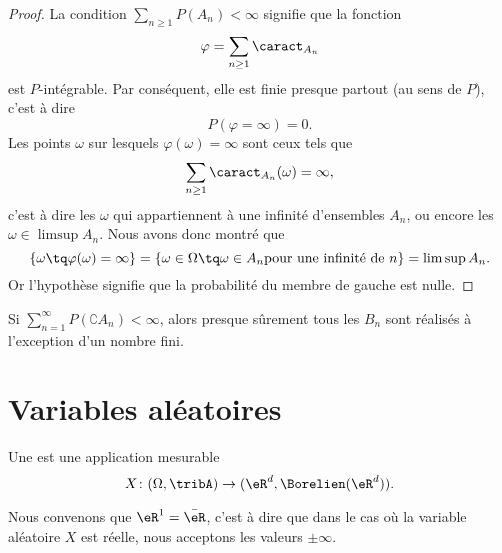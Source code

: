 \begin{proof}
    La condition \( \sum_{n\geq 1}P(A_n)<\infty\) signifie que la fonction
    \begin{equation}
        \varphi=\sum_{n\geq 1}\caract_{A_n}
    \end{equation}
    est \( P\)-intégrable. Par conséquent, elle est finie presque partout (au sens de \( P\)), c'est à dire
    \begin{equation}
        P(\varphi=\infty)=0.
    \end{equation}
    Les points \( \omega\) sur lesquels \( \varphi(\omega)=\infty\) sont ceux tels que
    \begin{equation}
        \sum_{n\geq 1}\caract_{A_n}(\omega)=\infty,
    \end{equation}
    c'est à dire les \( \omega\) qui appartiennent à une infinité d'ensembles \( A_n\), ou encore les \( \omega\in\limsup A_n\). Nous avons donc montré que
    \begin{equation}
        \{ \omega\tq \varphi(\omega)=\infty \}=\{ \omega\in\Omega\tq \omega\in A_n\text{pour une infinité de \( n\)} \}=\limsup A_n.
    \end{equation}
    Or l'hypothèse signifie que la probabilité du membre de gauche est nulle.
\end{proof}

\begin{corollary}
    Si \( \sum_{n=1}^{\infty}P(\complement A_n)<\infty\), alors presque sûrement tous les \( B_n\) sont réalisés à l'exception d'un nombre fini.
\end{corollary}

\section{Variables aléatoires}

\begin{definition}
    Une  est une application mesurable
    \begin{equation}
        X\colon (\Omega,\tribA)\to (\eR^d,\Borelien(\eR^d)).
    \end{equation}
\end{definition}
Nous convenons que \( \eR^1=\bar\eR\), c'est à dire que dans le cas où la variable aléatoire \( X\) est réelle, nous acceptons les valeurs \( \pm\infty\).

